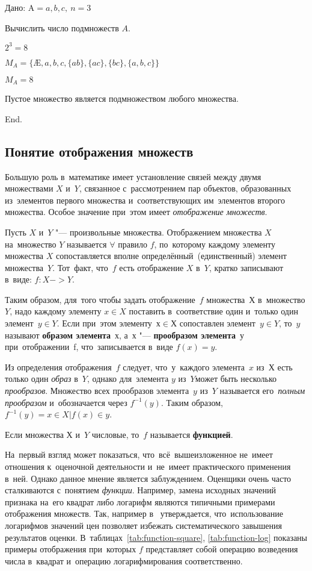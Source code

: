 \documentclass[]{scrartcl}
\begin{document}
\begin{Thexmpl}
	Дано: $\text{A}={{a, b, c}},\ n = 3$
	
	Вычислить число подмножеств $A$.
	
	$2^3 = 8$
	
	$M_A = \{\text{\AE{}}, a, b, c, \{ab\}, \{ac\}, \{bc\}, \{a,b,c\}\}$
	
	$M_A = 8$
\end{Thexmpl}

\begin{theorem}
	Пустое множество является подмножеством любого множества.
\end{theorem}
End.\cite{Studopedia:mnozhestvo}
\subsection{Понятие отображения множеств}
Большую роль в~математике имеет установление связей между двумя множествами $X$ и~$Y$, связанное с~рассмотрением пар объектов, образованных из~элементов первого множества и~соответствующих им~элементов второго множества. Особое значение при~этом имеет \emph{отображение множеств}.

Пусть $X$ и~$Y$ "--- произвольные множества. Отображением множества $X$ на~множество $Y$ называется $\forall$ правило $f$, по~которому каждому элементу множества $X$ сопоставляется вполне определённый~(единственный) элемент множества~$Y$. Тот~факт, что~$f$ есть отображение $X$ в~$Y$, кратко записывают в~виде: $f:X->Y$.

Таким образом, для~того чтобы задать отображение~$f$ множества~$Х$ в~множество $Y$, надо каждому элементу $x\in X$ поставить в~соответствие один и~только один элемент~$y \in Y$. Если при~этом элементу~$х \in Х$ сопоставлен элемент~$y \in Y$, то~$y$ называют \textbf{образом элемента}~$х$, а~$х$ "--- \textbf{прообразом элемента}~у при~отображении~f, что~записывается в~виде $f(x)=y$.

Из определения отображения~$f$ следует, что~у~каждого элемента~$x$ из~$Х$ есть только один \emph{образ} в~$Y$, однако для~элемента $y$ из~$Y$может быть несколько \emph{прообразов}. Множество всех прообразов элемента~$y$ из~$Y$ называется его~\emph{полным прообразом} и~обозначается через $f^{-1}(y)$. Таким образом, $f^{-1}(y)={x \in X | f(x) \in y}$.

Если множества $Х$ и~$Y$ числовые, то~$f$ называется \textbf{функцией}.

На~первый взгляд может показаться, что~всё~вышеизложенное не~имеет отношения к~оценочной деятельности и~не~имеет практического применения в~ней. Однако данное мнение является заблуждением. Оценщики очень часто сталкиваются с~понятием \emph{функции}. Например, замена исходных значений признака на~его квадрат либо логарифм являются типичными примерами отображения множеств. Так, например в~\cite{Laskin:lognorm} утверждается, что~использование логарифмов значений цен позволяет избежать систематического завышения результатов оценки. В~таблицах~\ref{tab:function-square}, \ref{tab:function-log} показаны примеры отображения при~которых $f$ представляет собой операцию возведения числа в~квадрат и~операцию логарифмирования соответственно.
\end{document}
